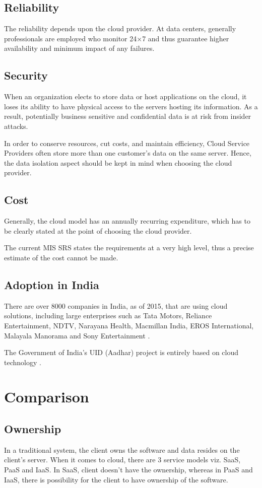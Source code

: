 \documentclass[12pt,a4paper,oneside]{article}
\begin{document}
\subsection{Reliability}
The reliability depends upon the cloud provider. At data centers, generally
professionals are employed who monitor 24\(\times\)7 and thus guarantee higher
availability and minimum impact of any failures.

\subsection{Security}
When an organization elects to store data or host applications on the cloud,
it loses its ability to have physical access to the servers hosting its
information. As a result, potentially business sensitive and confidential data
is at risk from insider attacks.

In order to conserve resources, cut costs, and maintain efficiency, Cloud
Service Providers often store more than one customer's data on the same server.
Hence, the data isolation aspect should be kept in mind when choosing the cloud
provider.

\subsection{Cost}
Generally, the cloud model has an annually recurring expenditure, which has to
be clearly stated at the point of choosing the cloud provider.

The current MIS SRS states the requirements at a very high level, thus a
precise estimate of the cost cannot be made.

\subsection{Adoption in India}
There are over 8000 companies in India, as of 2015, that are using cloud
solutions, including large enterprises such as Tata Motors, Reliance
Entertainment, NDTV, Narayana Health, Macmillan India, EROS International,
Malayala Manorama and Sony Entertainment \cite{ref6}.

The Government of India's UID (Aadhar) project is entirely based on cloud
technology \cite{ref7}.

\section{Comparison}
\subsection{Ownership}
In a traditional system, the client owns the software and data resides on the
client's server. When it comes to cloud, there are 3 service models viz. SaaS,
PaaS and IaaS. In SaaS, client doesn't have the ownership, whereas in PaaS and
IaaS, there is possibility for the client to have ownership of the software.
\end{document}
